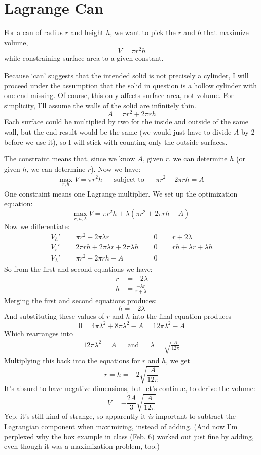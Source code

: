 \documentclass[11pt]{report}
\begin{document}

\section{Lagrange Can}

For a can of radius $r$ and height $h$, we want to pick the $r$ and $h$ that maximize volume,
\[V = \pi r^2h\]
while constraining surface area to a given constant.

Because `can' suggests that the intended solid is not precisely a cylinder, I will proceed under the assumption that the solid in question is a hollow cylinder with one end missing. Of course, this only affects surface area, not volume. For simplicity, I'll assume the walls of the solid are infinitely thin.
\[ A = \pi r^2 + 2\pi rh \]
Each surface could be multiplied by two for the inside and outside of the same wall, but the end result would be the same (we would just have to divide $A$ by 2 before we use it), so I will stick with counting only the outside surfaces.

The constraint means that, since we know $A$, given $r$, we can determine $h$ (or given $h$, we can determine $r$). Now we have:
\begin{align*}
  \underset{r,h}{\text{max}}\; V = \pi r^2h & & \text{subject to} & & \pi r^2 + 2\pi rh = A
\end{align*}
One constraint means one Lagrange multiplier. We set up the optimization equation:
\[
  \underset{r,h,\lambda}{\text{max}}\;V = \pi r^2h + \lambda(\pi r^2 + 2\pi rh - A)
\]
Now we differentiate:
\begin{align*}
  V_h' &= \pi r^2 + 2\pi\lambda r &= 0 &= r + 2\lambda \\
  V_r' &= 2\pi rh + 2\pi\lambda r + 2\pi\lambda h &= 0 &= rh + \lambda r + \lambda h \\
  V_\lambda' &= \pi r^2 + 2\pi rh - A &= 0 &
\end{align*}
So from the first and second equations we have:
\begin{align*}
  r &= -2\lambda \\
  h &= \frac{-\lambda r}{r + \lambda}
\end{align*}
Merging the first and second equations produces:
\[
  h = -2\lambda
\]
And substituting these values of $r$ and $h$ into the final equation produces
\[
  0 = 4\pi\lambda^2 + 8\pi\lambda^2 - A = 12\pi\lambda^2 - A
\]
Which rearranges into
\begin{align*}
  12\pi\lambda^2 = A & & \text{and} & & \lambda = \sqrt{\frac{A}{12\pi}}
\end{align*}
Multiplying this back into the equations for $r$ and $h$, we get
\[
  r = h = -2\sqrt{\frac{A}{12\pi}}
\]
It's absurd to have negative dimensions, but let's continue, to derive the volume:
\[
  V = - \frac{2A}{3}\sqrt{\frac{A}{12\pi}}
\]
Yep, it's still kind of strange, so apparently it \emph{is} important to subtract the Lagrangian component when maximizing, instead of adding. (And now I'm perplexed why the box example in class (Feb. 6) worked out just fine by adding, even though it was a maximization problem, too.)
\end{document}
